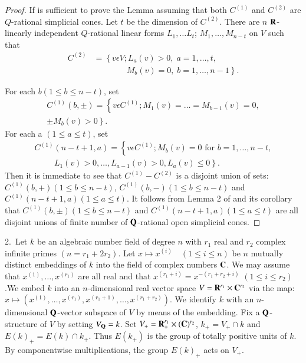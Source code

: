 \begin{proof}
If is sufficient to prove the Lemma assuming that both $C^{(1)}$ and $C^{(2)}$ are $Q$-rational simplicial cones. Let $t$ be the dimension of $C^{(2)}$. There are $n$ $\mathbf{R}$-linearly independent $Q$-rational linear forms $L_1, \ldots L_t$; $M_1, \ldots, M_{n-t}$ on $V$ such that 
\begin{align*}
C^{(2)} & = \left\{ v \epsilon V; L_a (v) > 0,\; a = 1 , \ldots, t, \right. \\
& \qquad \qquad \left. M_b (v) = 0, \; b = 1, \ldots, n -1 \right\}.
\end{align*}

For each $b(1 \leqslant b \leqslant n -t)$, set
\begin{gather*}
C^{(1)} (b , \pm) = \left\{ v \epsilon C^{(1)}; M_1 (v) = \ldots = M_{b-1} (v) =0,  \right.\\
\left. \pm M_b (v) > 0\right\}.
\end{gather*}
For each a $(1 \leqslant a \leqslant t)$, set 
\begin{multline*}
 C^{(1)} (n-t+1,a)
=\left\{v \epsilon C^{(1)}; M_b (v) = 0 \text{ for } b = 1, \ldots, n -t ,\right.\\
 \hspace{1cm} \left. L_1 (v) > 0, \ldots, L_{a-1} (v) > 0, L_a (v) \leqslant 0\right\}.
\end{multline*}
Then it is immediate to see that $C^{(1)} - C^{(2)}$ is a disjoint union of sets: $C^{(1)} (b, +) (1 \leqslant b \leqslant n -t)$, $C^{(1)} (b,-) (1 \leqslant b \leqslant n -t)$ and $C^{(1)} (n-t+1, a) (1\leqslant a \leqslant t)$. It follows from Lemma 2 of \cite{art8-1} and its corollary that $C^{(1)} (b, \pm) (1 \leqslant b \leqslant n -t)$ and $C^{(1)} (n - t + 1, a) (1\leqslant a \leqslant t)$ are all disjoint unions of finite number of $\mathbf{Q}$-rational open simplicial cones. 
\end{proof}

2.~Let $k$ be an algebraic number field of degree $n$ with $r_1$ real and $r_2$ complex infinite primes $(n = r_1 + 2 r_2)$. Let $x \mapsto x^{(i)} \quad (1 \leqslant  i \leqslant n)$ be $n$ mutually distinct embeddings of $k$ into the field of complex numbers $\mathbf{C}$. We may assume that $x^{(1)}, \ldots, x^{(r_1)}$ are all real and that $x^{(r_1+i)} = x^{-(r_1+r_2 + i)}$ $(1 \leqslant i \leqslant r_2)$.\pageoriginale We embed $k$ into an $n$-dimensional real vector space $V = \mathbf{R}^{r_1} \times \mathbf{C}^{r_2}$ via the map: $x \longmapsto (x^{(1)}, \ldots, x^{(r_1)}, x^{(r_1 +1)}, \ldots, x^{(r_1 + r_2)})$. We identify $k$ with an $n$-dimensional $\mathbf{Q}$-vector subspace of $V$ by means of the embedding. Fix a $\mathbf{Q}$-structure of $V$ by setting $V_{\mathbf{Q}} = k$. Set $V_+ = \mathbf{R}^{r_1}_+ \times (\mathbf{C})^{r_2}$, $k_+ = V_+ \cap k$ and $E(k)_+ = E (k) \cap k_+$. Thus $E(k_+)$ is the group of totally positive units of $k$. By componentwise multiplications, the group $E(k)_+$ acts on $V_+$.

